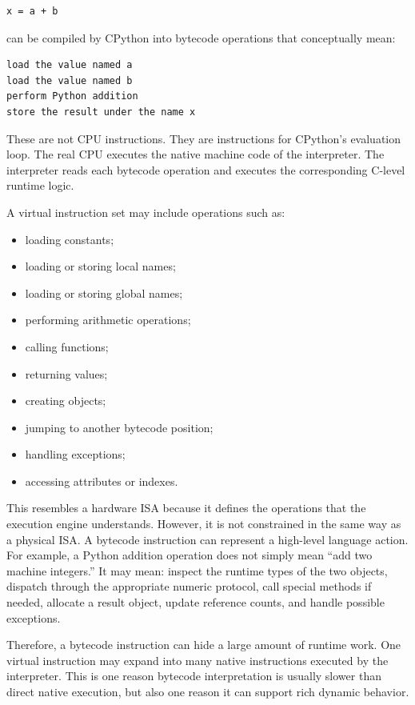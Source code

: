 \begin{verbatim}
x = a + b
\end{verbatim}

can be compiled by CPython into bytecode operations that conceptually mean:

\begin{verbatim}
load the value named a
load the value named b
perform Python addition
store the result under the name x
\end{verbatim}

These are not CPU instructions. They are instructions for CPython's evaluation loop. The real CPU executes the native machine code of the interpreter. The interpreter reads each bytecode operation and executes the corresponding C-level runtime logic.

A virtual instruction set may include operations such as:

\begin{itemize}
    \item loading constants;
    \item loading or storing local names;
    \item loading or storing global names;
    \item performing arithmetic operations;
    \item calling functions;
    \item returning values;
    \item creating objects;
    \item jumping to another bytecode position;
    \item handling exceptions;
    \item accessing attributes or indexes.
\end{itemize}

This resembles a hardware ISA because it defines the operations that the execution engine understands. However, it is not constrained in the same way as a physical ISA. A bytecode instruction can represent a high-level language action. For example, a Python addition operation does not simply mean ``add two machine integers.'' It may mean: inspect the runtime types of the two objects, dispatch through the appropriate numeric protocol, call special methods if needed, allocate a result object, update reference counts, and handle possible exceptions.

Therefore, a bytecode instruction can hide a large amount of runtime work. One virtual instruction may expand into many native instructions executed by the interpreter. This is one reason bytecode interpretation is usually slower than direct native execution, but also one reason it can support rich dynamic behavior.

